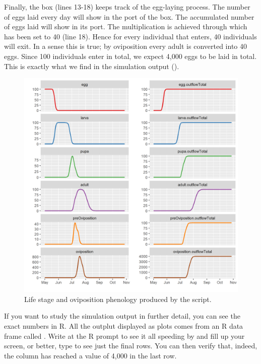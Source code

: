 Finally, the  box (lines 13-18) keeps track of the egg-laying process. The number of eggs laid every day will show in the  port of the  box. The accumulated number of eggs laid will show in its  port. The multiplication is achieved through  which has been set to 40 (line 18). Hence for every individual that enters, 40 individuals will exit. In a sense this is true; by oviposition every adult is converted into 40 eggs. Since 100 individuals enter in total, we expect 4,000 eggs to be laid in total. This is exactly what we find in the simulation output ().
 
\begin{figure}
\centering
\includegraphics[width=\textwidth]{graphics/butterfly3}
\caption{Life stage and oviposition phenology produced by the  script.}
\label{fig:butterfly3}
\end{figure}

If you want to study the simulation output in further detail, you can see the exact numbers in R. All the outplut displayed as plots comes from an R data frame called . Write  at the R prompt to see it all speeding by and fill up your screen, or better, type  to see just the final rows. You can then verify that, indeed, the  column has reached a value of 4,000 in the last row.

